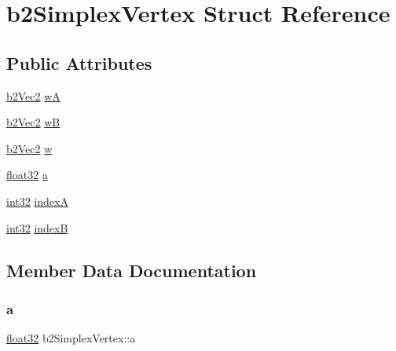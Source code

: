 \hypertarget{structb2_simplex_vertex}{}\section{b2\+Simplex\+Vertex Struct Reference}
\label{structb2_simplex_vertex}
\subsection*{Public Attributes}
\begin{DoxyCompactItemize}
\item 
\mbox{\hyperlink{structb2_vec2}{b2\+Vec2}} \mbox{\hyperlink{structb2_simplex_vertex_a35098ec42d2615c7dc6d645e4a7c0674}{wA}}
\item 
\mbox{\hyperlink{structb2_vec2}{b2\+Vec2}} \mbox{\hyperlink{structb2_simplex_vertex_a73d6b5be3648a293b103d559e9d03534}{wB}}
\item 
\mbox{\hyperlink{structb2_vec2}{b2\+Vec2}} \mbox{\hyperlink{structb2_simplex_vertex_a32e374d7bbb6d8a0589a91bd3de3029f}{w}}
\item 
\mbox{\hyperlink{b2_settings_8h_aacdc525d6f7bddb3ae95d5c311bd06a1}{float32}} \mbox{\hyperlink{structb2_simplex_vertex_ace99ab00d1d83a7290d283f73671e594}{a}}
\item 
\mbox{\hyperlink{b2_settings_8h_a43d43196463bde49cb067f5c20ab8481}{int32}} \mbox{\hyperlink{structb2_simplex_vertex_ac53c648f53d28391aaff758d99a7868d}{indexA}}
\item 
\mbox{\hyperlink{b2_settings_8h_a43d43196463bde49cb067f5c20ab8481}{int32}} \mbox{\hyperlink{structb2_simplex_vertex_a0c25e5f713707356122e91bd20e4f40c}{indexB}}
\end{DoxyCompactItemize}


\subsection{Member Data Documentation}
\mbox{\label{structb2_simplex_vertex_ace99ab00d1d83a7290d283f73671e594}} 
\subsubsection{\texorpdfstring{a}{a}}
{\footnotesize\ttfamily \mbox{\hyperlink{b2_settings_8h_aacdc525d6f7bddb3ae95d5c311bd06a1}{float32}} b2\+Simplex\+Vertex\+::a}

